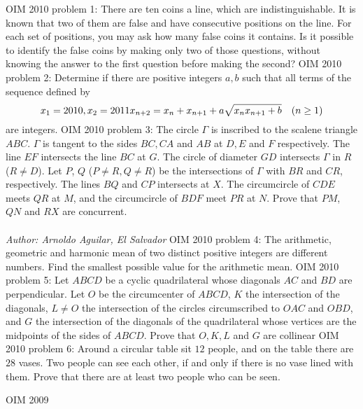OIM 2010 problem 1:  There are ten coins a line, which are indistinguishable. It is known that two of them are false and have consecutive positions on the line. For each set of positions, you may ask how many false coins it contains. Is it possible to identify the false coins by making only two of those questions, without knowing the answer to the first question before making the second? 
OIM 2010 problem 2:  Determine if there are positive integers $a, b$ such that all terms of the sequence defined by
\[ x_1= 2010,x_2= 2011\\  x_{n+2}= x_n+ x_{n+1}+a\sqrt{x_nx_{n+1}+b}\quad (n\ge 1) \]
are integers. 
OIM 2010 problem 3:  The circle $ \Gamma $ is inscribed to the scalene triangle  $ABC$. $ \Gamma $ is tangent to the sides $BC, CA$ and $AB$ at $D, E$ and $F$ respectively. The line $EF$ intersects the line $BC$ at $G$. The circle of diameter $GD$ intersects $ \Gamma $  in $R$ ($ R\neq D $). Let $P$, $Q$ ($ P\neq R , Q\neq R $)  be the intersections of $ \Gamma $  with $BR$ and $CR$, respectively. The lines $BQ$ and $CP$ intersects at $X$. The circumcircle of $CDE$ meets $QR$ at $M$, and the circumcircle of $BDF$ meet $PR$ at $N$. Prove that $PM$, $QN$ and $RX$ are concurrent. \\\\
\textit{Author: Arnoldo Aguilar, El Salvador} 
OIM 2010 problem 4:  The arithmetic, geometric and harmonic mean of two distinct positive integers are different numbers. Find the smallest possible value for the arithmetic mean. 
OIM 2010 problem 5:  Let $ABCD$ be a cyclic quadrilateral whose diagonals $AC$ and $BD$ are perpendicular. Let $O$ be the circumcenter of $ABCD$, $K$ the intersection of the diagonals,  $ L\neq O $ the intersection of the circles circumscribed to $OAC$ and $OBD$, and $G$ the intersection of the diagonals of the quadrilateral whose vertices are the midpoints of the sides of $ABCD$. Prove that $O, K, L$ and $G$ are collinear 
OIM 2010 problem 6:  Around a circular table sit $12$ people, and on the table there are $28$ vases. Two people can see each other, if and only if there is no vase lined with them. Prove that there are at least two people who can be seen. 

OIM 2009 

